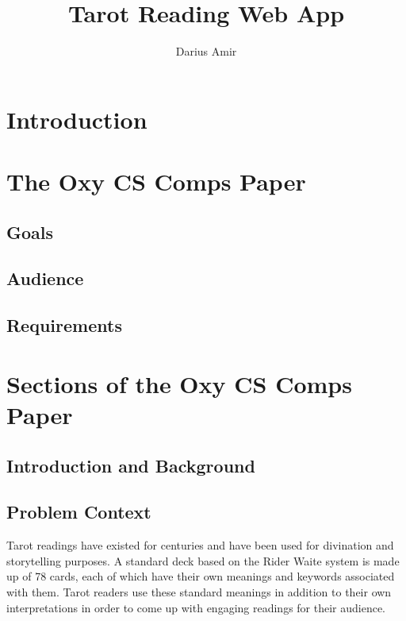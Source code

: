 \documentclass[10pt,twocolumn]{article}
\title{Tarot Reading Web App}
\author{Darius Amir}
\affiliation{Occidental College}
\begin{document}
\maketitle

\begin{abstract}

\end{abstract}

\section{Introduction}

\section{The Oxy CS Comps Paper}

\subsection{Goals}

\subsection{Audience}

\subsection{Requirements}

\section{Sections of the Oxy CS Comps Paper}

\subsection{Introduction and Background}

\subsection{Problem Context}

Tarot readings have existed for centuries \cite{decker_dummett_2013} and have been used for divination and storytelling purposes. A standard deck based on the Rider Waite system \cite{tarot.com} is made up of 78 cards, each of which have their own meanings and keywords associated with them. Tarot readers use these standard meanings in addition to their own interpretations in order to come up with engaging readings for their audience. 
\end{document}
